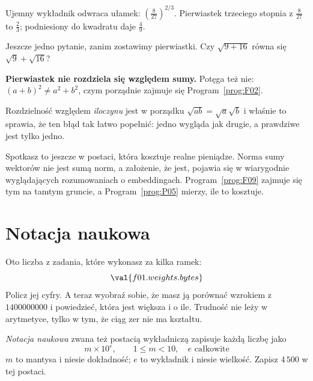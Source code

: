 \begin{fr}
\begin{ansblock}
Ujemny wykładnik odwraca ułamek: $\left(\tfrac{8}{27}\right)^{2/3}$.
Pierwiastek trzeciego stopnia z $\tfrac{8}{27}$ to $\tfrac{2}{3}$; podniesiony
do kwadratu daje $\tfrac{4}{9}$.
\end{ansblock}

Jeszcze jedno pytanie, zanim zostawimy pierwiastki. Czy $\sqrt{9 + 16}$ równa
się $\sqrt{9} + \sqrt{16}$?
\nextframe
\end{fr}

\begin{fr}
\begin{trapbox}
\textbf{Pierwiastek nie rozdziela się względem sumy.} Potęga też nie:
$(a+b)^{2} \ne a^{2} + b^{2}$, czym porządnie zajmuje się
Program~\ref{prog:F02}.

Rozdzielność względem \emph{iloczynu} jest w porządku \dash{}
$\sqrt{ab} = \sqrt{a}\sqrt{b}$ \dash{} i właśnie to sprawia, że ten błąd tak
łatwo popełnić: jedno wygląda jak drugie, a prawdziwe jest tylko jedno.

Spotkasz to jeszcze w postaci, która kosztuje realne pieniądze. Norma sumy
wektorów nie jest sumą norm, a założenie, że jest, pojawia się w wiarygodnie
wyglądających rozumowaniach o embeddingach. Program~\ref{prog:F09} zajmuje się
tym na tamtym gruncie, a Program~\ref{prog:P05} mierzy, ile to kosztuje.
\end{trapbox}
\end{fr}

\section{Notacja naukowa}
\label{sec:F01-scientific}

\begin{fr}
Oto liczba z zadania, które wykonasz za kilka ramek:
\[ \val{f01.weights.bytes} \]
Policz jej cyfry. A teraz wyobraź sobie, że masz ją porównać wzrokiem z
$1400000000$ i powiedzieć, która jest większa i o ile. Trudność nie leży w
arytmetyce, tylko w tym, że ciąg zer nie ma kształtu.

\emph{Notacja naukowa} \dash{} zwana też postacią wykładniczą \dash{} zapisuje
każdą liczbę jako
\[ m \times 10^{e}, \qquad 1 \le m < 10, \quad e \text{ całkowite} \]
$m$ to mantysa i niesie dokładność; $e$ to wykładnik i niesie wielkość. Zapisz
$4\,500$ w tej postaci.
\nextframe
\end{fr}

